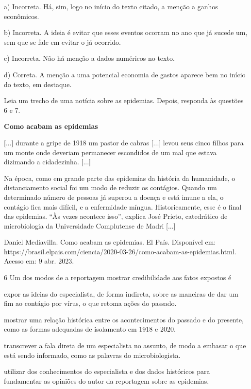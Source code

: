 a) Incorreta. Há, sim, logo no início do texto citado, a menção a ganhos
econômicos.

b) Incorreta. A ideia é evitar que esses eventos ocorram no ano que já
sucede um, sem que se fale em evitar o já ocorrido.

c) Incorreta. Não há menção a dados numéricos no texto.

d) Correta. A menção a uma potencial economia de gastos aparece bem no
início do texto, em destaque.

Leia um trecho de uma notícia sobre as epidemias. Depois, responda às
questões 6 e 7.

\textbf{Como acabam as epidemias}

{[}...{]} durante a gripe de 1918 um pastor de cabras {[}...{]} levou
seus cinco filhos para um monte onde deveriam permanecer escondidos de
um mal que estava dizimando a cidadezinha. {[}...{]}

Na época, como em grande parte das epidemias da história da humanidade,
o distanciamento social foi um modo de reduzir os contágios. Quando um
determinado número de pessoas já superou a doença e está imune a ela, o
contágio fica mais difícil, e a enfermidade míngua. Historicamente, esse
é o final das epidemias. ``Às vezes acontece isso'', explica José
Prieto, catedrático de microbiologia da Universidade Complutense de
Madri {[}...{]}

Daniel Mediavilla. Como acabam as epidemias. El País. Disponível em:
https://brasil.elpais.com/ciencia/2020-03-26/como-acabam-as-epidemias.html.
Acesso em: 9 abr. 2023.

\num{6} Um dos modos de a reportagem mostrar credibilidade aos fatos
expostos é

\begin{escolha}
\item expor as ideias do especialista, de forma indireta, sobre as
maneiras de dar um fim ao contágio por vírus, o que retoma ações do
passado.

\item mostrar uma relação histórica entre os acontecimentos do passado e
do presente, como as formas adequadas de isolamento em 1918 e 2020.

\item transcrever a fala direta de um especialista no assunto, de modo a
embasar o que está sendo informado, como as palavras do microbiologista.

\item utilizar dos conhecimentos do especialista e dos dados históricos
para fundamentar as opiniões do autor da reportagem sobre as epidemias.
\end{escolha}

